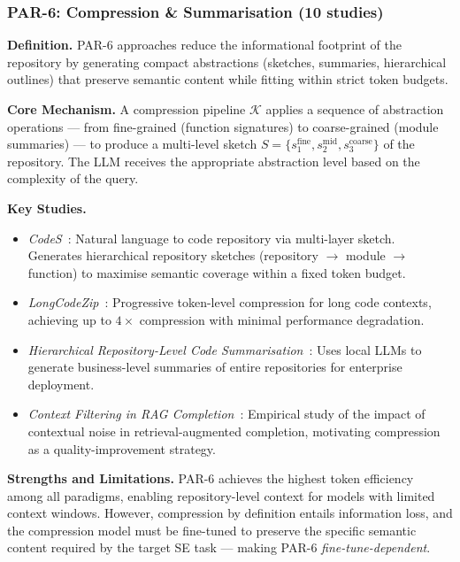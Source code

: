 \documentclass[acmsmall,screen,review]{acmart}
\begin{document}
\subsubsection{PAR-6: Compression \& Summarisation (10 studies)}
\label{subsubsec:par6}

\textbf{Definition.} PAR-6 approaches reduce the informational
footprint of the repository by generating compact abstractions
(sketches, summaries, hierarchical outlines) that preserve semantic
content while fitting within strict token budgets.

\textbf{Core Mechanism.} A compression pipeline $\mathcal{K}$ applies
a sequence of abstraction operations — from fine-grained (function
signatures) to coarse-grained (module summaries) — to produce a
multi-level sketch $S = \{s_1^{\text{fine}}, s_2^{\text{mid}},
s_3^{\text{coarse}}\}$ of the repository. The LLM receives the
appropriate abstraction level based on the complexity of the query.

\textbf{Key Studies.}
\begin{itemize}
  \item \textit{CodeS}~\cite{Zan2025CodeS}: Natural language to code
    repository via multi-layer sketch. Generates hierarchical
    repository sketches (repository $\to$ module $\to$ function) to
    maximise semantic coverage within a fixed token budget.
  \item \textit{LongCodeZip}~\cite{Shi2025LongCodeZip}: Progressive
    token-level compression for long code contexts, achieving up to
    $4\times$ compression with minimal performance degradation.
  \item \textit{Hierarchical Repository-Level Code
    Summarisation}~\cite{Dhulshette2025Hier}: Uses local LLMs to
    generate business-level summaries of entire repositories for
    enterprise deployment.
  \item \textit{Context Filtering in RAG
    Completion}~\cite{Sedov2025Filter}: Empirical study of the impact
    of contextual noise in retrieval-augmented completion, motivating
    compression as a quality-improvement strategy.
\end{itemize}

\textbf{Strengths and Limitations.}
PAR-6 achieves the highest token efficiency among all paradigms,
enabling repository-level context for models with limited context
windows. However, compression by definition entails information loss,
and the compression model must be fine-tuned to preserve the specific
semantic content required by the target SE task —
making PAR-6 \emph{fine-tune-dependent}.
\end{document}
